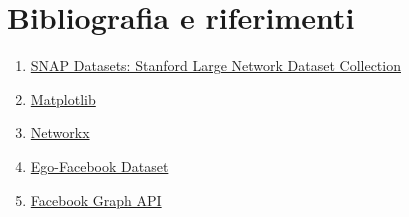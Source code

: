 \renewcommand\refname{Bibliografia}
\section{Bibliografia e riferimenti} %

\begin{enumerate} 
    \item \href{https://snap.stanford.edu/}{SNAP Datasets: Stanford Large Network Dataset Collection}
    \item \href{https://matplotlib.org/}{Matplotlib}
    \item \href{https://networkx.org/}{Networkx}
    \item \href{https://snap.stanford.edu/data/ego-Facebook.html}{Ego-Facebook Dataset}
    \item \href{https://developers.facebook.com/docs/graph-api}{Facebook Graph API}

\end{enumerate}